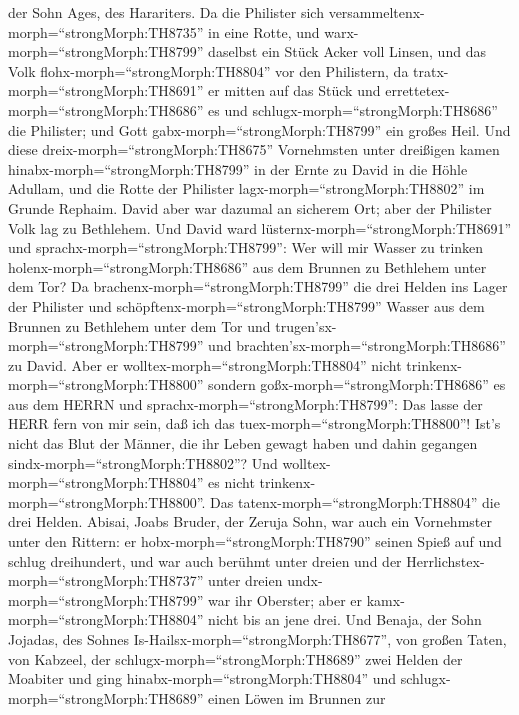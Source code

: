 der Sohn Ages, des Harariters. Da die Philister sich
versammeltenx-morph=``strongMorph:TH8735'' in eine Rotte, und
warx-morph=``strongMorph:TH8799'' daselbst ein Stück Acker voll Linsen,
und das Volk flohx-morph=``strongMorph:TH8804'' vor den Philistern,
 da tratx-morph=``strongMorph:TH8691'' er mitten auf das
Stück und errettetex-morph=``strongMorph:TH8686'' es und
schlugx-morph=``strongMorph:TH8686'' die Philister; und Gott
gabx-morph=``strongMorph:TH8799'' ein großes Heil.  Und
diese dreix-morph=``strongMorph:TH8675'' Vornehmsten unter dreißigen
kamen hinabx-morph=``strongMorph:TH8799'' in der Ernte zu David in die
Höhle Adullam, und die Rotte der Philister
lagx-morph=``strongMorph:TH8802'' im Grunde Rephaim.  David
aber war dazumal an sicherem Ort; aber der Philister Volk lag zu
Bethlehem.  Und David ward
lüsternx-morph=``strongMorph:TH8691'' und
sprachx-morph=``strongMorph:TH8799'': Wer will mir Wasser zu trinken
holenx-morph=``strongMorph:TH8686'' aus dem Brunnen zu Bethlehem unter
dem Tor?  Da brachenx-morph=``strongMorph:TH8799'' die drei
Helden ins Lager der Philister und
schöpftenx-morph=``strongMorph:TH8799'' Wasser aus dem Brunnen zu
Bethlehem unter dem Tor und trugen'sx-morph=``strongMorph:TH8799'' und
brachten'sx-morph=``strongMorph:TH8686'' zu David. Aber er
wolltex-morph=``strongMorph:TH8804'' nicht
trinkenx-morph=``strongMorph:TH8800'' sondern
goßx-morph=``strongMorph:TH8686'' es aus dem HERRN  und
sprachx-morph=``strongMorph:TH8799'': Das lasse der HERR fern von mir
sein, daß ich das tuex-morph=``strongMorph:TH8800''! Ist's nicht das
Blut der Männer, die ihr Leben gewagt haben und dahin gegangen
sindx-morph=``strongMorph:TH8802''? Und
wolltex-morph=``strongMorph:TH8804'' es nicht
trinkenx-morph=``strongMorph:TH8800''. Das
tatenx-morph=``strongMorph:TH8804'' die drei Helden. 
Abisai, Joabs Bruder, der Zeruja Sohn, war auch ein Vornehmster unter
den Rittern: er hobx-morph=``strongMorph:TH8790'' seinen Spieß auf und
schlug dreihundert, und war auch berühmt unter dreien  und
der Herrlichstex-morph=``strongMorph:TH8737'' unter dreien
undx-morph=``strongMorph:TH8799'' war ihr Oberster; aber er
kamx-morph=``strongMorph:TH8804'' nicht bis an jene drei. 
Und Benaja, der Sohn Jojadas, des Sohnes
Is-Hailsx-morph=``strongMorph:TH8677'', von großen Taten, von Kabzeel,
der schlugx-morph=``strongMorph:TH8689'' zwei Helden der Moabiter und
ging hinabx-morph=``strongMorph:TH8804'' und
schlugx-morph=``strongMorph:TH8689'' einen Löwen im Brunnen zur
